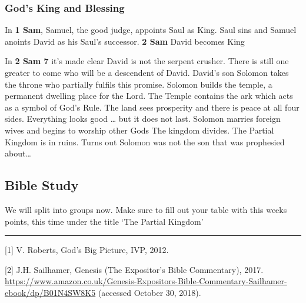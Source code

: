 \documentclass[]{article}
\begin{document}
\hypertarget{gods-king-and-blessing}{%
\subsubsection{God's King and Blessing}\label{gods-king-and-blessing}}

In \textbf{1 Sam}, Samuel, the good judge, appoints Saul as King. Saul
sins and Samuel anoints David as his Saul's successor. \textbf{2 Sam}
David becomes King

In \textbf{2 Sam 7} it's made clear David is not the serpent crusher.
There is still one greater to come who will be a descendent of David.
David's son Solomon takes the throne who partially fulfils this promise.
Solomon builds the temple, a permanent dwelling place for the Lord. The
Temple contains the ark which acts as a symbol of God's Rule. The land
sees prosperity and there is peace at all four sides. Everything looks
good \ldots{} but it does not last. Solomon marries foreign wives and
begins to worship other Gods The kingdom divides. The Partial Kingdom is
in ruins. Turns out Solomon was not the son that was prophesied
about\ldots{}

\hypertarget{bible-study}{%
\subsection{Bible Study}\label{bible-study}}

We will split into groups now. Make sure to fill out your table with
this weeks points, this time under the title `The Partial Kingdom'

\begin{center}\rule{0.5\linewidth}{\linethickness}\end{center}

\hypertarget{refs}{}
\leavevmode\hypertarget{ref-roberts2012}{}%
{[}1{]} V. Roberts, God's Big Picture, IVP, 2012.

\leavevmode\hypertarget{ref-sailhamer2017}{}%
{[}2{]} J.H. Sailhamer, Genesis (The Expositor's Bible Commentary),
2017.
\url{https://www.amazon.co.uk/Genesis-Expositors-Bible-Commentary-Sailhamer-ebook/dp/B01N4SW8K5}
(accessed October 30, 2018).
\end{document}
